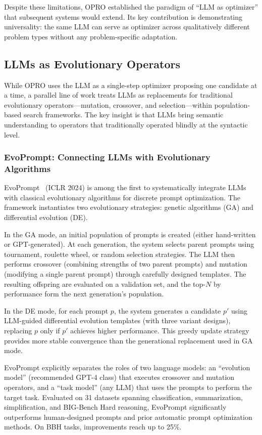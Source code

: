 Despite these limitations, OPRO established the paradigm of ``LLM as optimizer'' that subsequent systems would extend. Its key contribution is demonstrating universality: the same LLM can serve as optimizer across qualitatively different problem types without any problem-specific adaptation.

\subsection{LLMs as Evolutionary Operators}
\label{sec:llm-evolutionary}

While OPRO uses the LLM as a single-step optimizer proposing one candidate at a time, a parallel line of work treats LLMs as replacements for traditional evolutionary operators---mutation, crossover, and selection---within population-based search frameworks. The key insight is that LLMs bring semantic understanding to operators that traditionally operated blindly at the syntactic level.

\subsubsection{EvoPrompt: Connecting LLMs with Evolutionary Algorithms}

EvoPrompt~\citep{evoprompt2024} (ICLR 2024) is among the first to systematically integrate LLMs with classical evolutionary algorithms for discrete prompt optimization. The framework instantiates two evolutionary strategies: genetic algorithms (GA) and differential evolution (DE).

In the GA mode, an initial population of prompts is created (either hand-written or GPT-generated). At each generation, the system selects parent prompts using tournament, roulette wheel, or random selection strategies. The LLM then performs crossover (combining strengths of two parent prompts) and mutation (modifying a single parent prompt) through carefully designed templates. The resulting offspring are evaluated on a validation set, and the top-$N$ by performance form the next generation's population.

In the DE mode, for each prompt $p$, the system generates a candidate $p'$ using LLM-guided differential evolution templates (with three variant designs), replacing $p$ only if $p'$ achieves higher performance. This greedy update strategy provides more stable convergence than the generational replacement used in GA mode.

EvoPrompt explicitly separates the roles of two language models: an ``evolution model'' (recommended GPT-4 class) that executes crossover and mutation operators, and a ``task model'' (any LLM) that uses the prompts to perform the target task. Evaluated on 31 datasets spanning classification, summarization, simplification, and BIG-Bench Hard reasoning, EvoPrompt significantly outperforms human-designed prompts and prior automatic prompt optimization methods. On BBH tasks, improvements reach up to 25\%.

